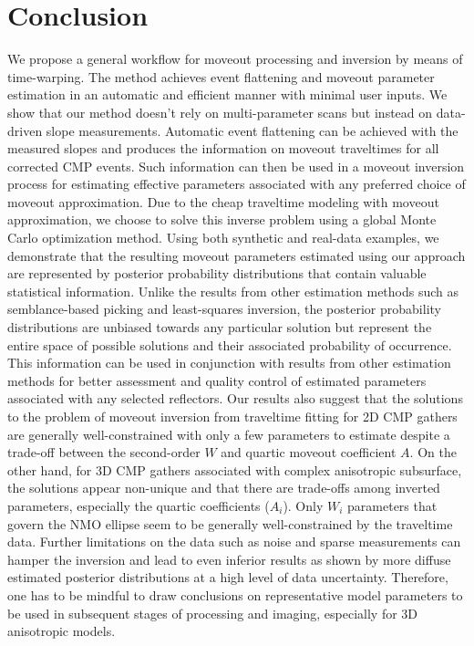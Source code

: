 \section{Conclusion}

We propose a general workflow for moveout processing and inversion by means of time-warping. The method achieves event flattening and moveout parameter estimation in an automatic and efficient manner with minimal user inputs. We show that our method doesn't rely on multi-parameter scans but instead on data-driven slope measurements. Automatic event flattening can be achieved with the measured slopes and produces the information on moveout traveltimes for all corrected CMP events. Such information can then be used in a moveout inversion process for estimating effective parameters associated with any preferred choice of moveout approximation. Due to the cheap traveltime modeling with moveout approximation, we choose to solve this inverse problem using a global Monte Carlo optimization method. Using both synthetic and real-data examples, we demonstrate that the resulting moveout parameters estimated using our approach are represented by posterior probability distributions that contain valuable statistical information. Unlike the results from other estimation methods such as semblance-based picking and least-squares inversion, the posterior probability distributions are unbiased towards any particular solution but represent the entire space of possible solutions and their associated probability of occurrence. This information can be used in conjunction with results from other estimation methods for better assessment and quality control of estimated parameters associated with any selected reflectors. Our results also suggest that the solutions to the problem of moveout inversion from traveltime fitting for 2D CMP gathers are generally well-constrained with only a few parameters to estimate despite a trade-off between the second-order $W$ and quartic moveout coefficient $A$. On the other hand, for 3D CMP gathers associated with complex anisotropic subsurface, the solutions appear non-unique and that there are trade-offs among inverted parameters, especially the quartic coefficients ($A_i$). Only $W_i$ parameters that govern the NMO ellipse seem to be generally well-constrained by the traveltime data. Further limitations on the data such as noise and sparse measurements can hamper the inversion and lead to even inferior results as shown by more diffuse estimated posterior distributions at a high level of data uncertainty.  Therefore, one has to be mindful to draw conclusions on representative model parameters to be used in subsequent stages of processing and imaging, especially for 3D anisotropic models.

